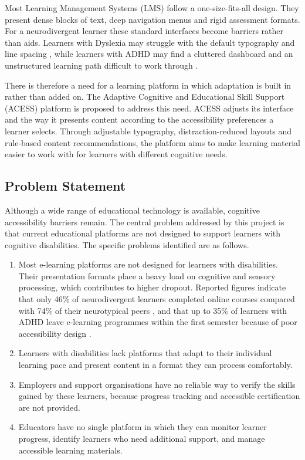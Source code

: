 \documentclass[12pt, oneside]{article} %
\begin{document}
Most Learning Management Systems (LMS) follow a one-size-fits-all design. They present dense blocks of text, deep navigation menus and rigid assessment formats. For a neurodivergent learner these standard interfaces become barriers rather than aids. Learners with Dyslexia may struggle with the default typography and line spacing \cite{franceschini_dyslexia}, while learners with ADHD may find a cluttered dashboard and an unstructured learning path difficult to work through \cite{barkley1997adhd}.

There is therefore a need for a learning platform in which adaptation is built in rather than added on. The Adaptive Cognitive and Educational Skill Support (ACESS) platform is proposed to address this need. ACESS adjusts its interface and the way it presents content according to the accessibility preferences a learner selects. Through adjustable typography, distraction-reduced layouts and rule-based content recommendations, the platform aims to make learning material easier to work with for learners with different cognitive needs.

\subsection{Problem Statement}

Although a wide range of educational technology is available, cognitive accessibility barriers remain. The central problem addressed by this project is that current educational platforms are not designed to support learners with cognitive disabilities. The specific problems identified are as follows.

\begin{enumerate}
    \item Most e-learning platforms are not designed for learners with disabilities. Their presentation formats place a heavy load on cognitive and sensory processing, which contributes to higher dropout. Reported figures indicate that only 46\% of neurodivergent learners completed online courses compared with 74\% of their neurotypical peers \cite{spencer2022neurodiversity}, and that up to 35\% of learners with ADHD leave e-learning programmes within the first semester because of poor accessibility design \cite{burl2024neurodiversent}.
    \item Learners with disabilities lack platforms that adapt to their individual learning pace and present content in a format they can process comfortably.
    \item Employers and support organisations have no reliable way to verify the skills gained by these learners, because progress tracking and accessible certification are not provided.
    \item Educators have no single platform in which they can monitor learner progress, identify learners who need additional support, and manage accessible learning materials.
\end{enumerate}
\end{document}
